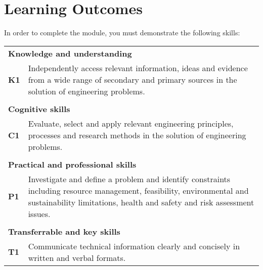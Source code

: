 \chapter{Learning Outcomes}

In order to complete the module, you must demonstrate the following skills:
\vspace{3mm} 

\begin{table}[h]
    \centering
    \begin{tabularx}{340pt}{lllll}
    \multicolumn{5}{X}{\textbf{Knowledge and understanding}}       \\
    \textbf{K1}          & \multicolumn{4}{X}{Independently access relevant information, ideas and evidence from a wide range of secondary and primary sources in the solution of engineering problems.}                \\
    \vspace{3mm} \\
    \multicolumn{5}{X}{\textbf{Cognitive skills}}                  \\
    \textbf{C1}          & \multicolumn{4}{X}{Evaluate, select and apply relevant engineering principles, processes and research methods in the solution of engineering problems.}            \\
    \vspace{3mm} \\
    \multicolumn{5}{X}{\textbf{Practical and professional skills}} \\
    \textbf{P1}          & \multicolumn{4}{X}{Investigate and define a problem and identify constraints including resource management, feasibility, environmental and sustainability limitations, health and safety and risk assessment issues.}         \\
    \vspace{3mm} \\
    \multicolumn{5}{X}{\textbf{Transferrable and key skills}}      \\
    \textbf{T1}          & \multicolumn{4}{X}{Communicate technical information clearly and concisely in written and verbal formats.}        
    \end{tabularx}
\end{table}
